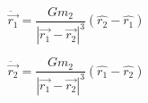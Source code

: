 \documentclass[12pt,fleqn]{article}\usepackage{../../common}
\begin{document}
$$ {\displaystyle {\ddot {\vec {r_{1}}}}={\frac {Gm_{2}}{|{\vec
        {r_{1}}}-{\vec {r_{2}}}|^{3}}}({\hat {r_{2}}}-{\hat {r_{1}}})}
$$

$${\displaystyle {\ddot {\vec {r_{2}}}}={\frac {Gm_{2}}{|{\vec
        {r_{1}}}-{\vec {r_{2}}}|^{3}}}({\hat {r_{1}}}-{\hat {r_{2}}})}
$$ 
\end{document}
